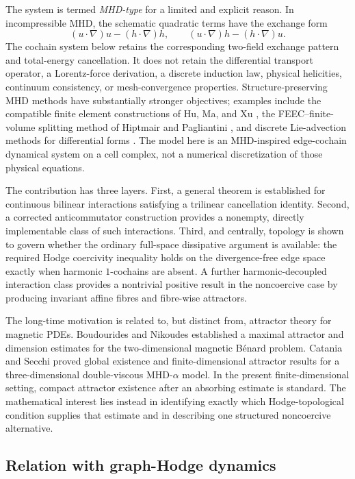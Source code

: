 \documentclass[11pt]{article}
\theoremstyle{remark}
\begin{document}
The system is termed \emph{MHD-type} for a limited and explicit reason. In incompressible MHD, the schematic quadratic terms have the exchange form
\[
(u\cdot\nabla)u-(h\cdot\nabla)h,
\qquad
(u\cdot\nabla)h-(h\cdot\nabla)u.
\]
The cochain system below retains the corresponding two-field exchange pattern and total-energy cancellation. It does not retain the differential transport operator, a Lorentz-force derivation, a discrete induction law, physical helicities, continuum consistency, or mesh-convergence properties. Structure-preserving MHD methods have substantially stronger objectives; examples include the compatible finite element constructions of Hu, Ma, and Xu \cite{HuMaXu2017}, the FEEC--finite-volume splitting method of Hiptmair and Pagliantini \cite{HiptmairPagliantini2018}, and discrete Lie-advection methods for differential forms \cite{MullenEtAl2011}. The model here is an MHD-inspired edge-cochain dynamical system on a cell complex, not a numerical discretization of those physical equations.

The contribution has three layers. First, a general theorem is established for continuous bilinear interactions satisfying a trilinear cancellation identity. Second, a corrected anticommutator construction provides a nonempty, directly implementable class of such interactions. Third, and centrally, topology is shown to govern whether the ordinary full-space dissipative argument is available: the required Hodge coercivity inequality holds on the divergence-free edge space exactly when harmonic $1$-cochains are absent. A further harmonic-decoupled interaction class provides a nontrivial positive result in the noncoercive case by producing invariant affine fibres and fibre-wise attractors.

The long-time motivation is related to, but distinct from, attractor theory for magnetic PDEs. Boudourides and Nikoudes \cite{BoudouridesNikoudes1990} established a maximal attractor and dimension estimates for the two-dimensional magnetic B\'enard problem. Catania and Secchi \cite{CataniaSecchi2010} proved global existence and finite-dimensional attractor results for a three-dimensional double-viscous MHD-$\alpha$ model. In the present finite-dimensional setting, compact attractor existence after an absorbing estimate is standard. The mathematical interest lies instead in identifying exactly which Hodge-topological condition supplies that estimate and in describing one structured noncoercive alternative.

\subsection{Relation with graph-Hodge dynamics}
\end{document}
